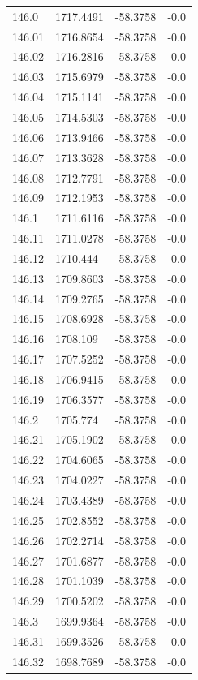 \begin{table}[H]
\begin{tabular}{llll}
146.0 & 1717.4491 & -58.3758 & -0.0 \\
146.01 & 1716.8654 & -58.3758 & -0.0 \\
146.02 & 1716.2816 & -58.3758 & -0.0 \\
146.03 & 1715.6979 & -58.3758 & -0.0 \\
146.04 & 1715.1141 & -58.3758 & -0.0 \\
146.05 & 1714.5303 & -58.3758 & -0.0 \\
146.06 & 1713.9466 & -58.3758 & -0.0 \\
146.07 & 1713.3628 & -58.3758 & -0.0 \\
146.08 & 1712.7791 & -58.3758 & -0.0 \\
146.09 & 1712.1953 & -58.3758 & -0.0 \\
146.1 & 1711.6116 & -58.3758 & -0.0 \\
146.11 & 1711.0278 & -58.3758 & -0.0 \\
146.12 & 1710.444 & -58.3758 & -0.0 \\
146.13 & 1709.8603 & -58.3758 & -0.0 \\
146.14 & 1709.2765 & -58.3758 & -0.0 \\
146.15 & 1708.6928 & -58.3758 & -0.0 \\
146.16 & 1708.109 & -58.3758 & -0.0 \\
146.17 & 1707.5252 & -58.3758 & -0.0 \\
146.18 & 1706.9415 & -58.3758 & -0.0 \\
146.19 & 1706.3577 & -58.3758 & -0.0 \\
146.2 & 1705.774 & -58.3758 & -0.0 \\
146.21 & 1705.1902 & -58.3758 & -0.0 \\
146.22 & 1704.6065 & -58.3758 & -0.0 \\
146.23 & 1704.0227 & -58.3758 & -0.0 \\
146.24 & 1703.4389 & -58.3758 & -0.0 \\
146.25 & 1702.8552 & -58.3758 & -0.0 \\
146.26 & 1702.2714 & -58.3758 & -0.0 \\
146.27 & 1701.6877 & -58.3758 & -0.0 \\
146.28 & 1701.1039 & -58.3758 & -0.0 \\
146.29 & 1700.5202 & -58.3758 & -0.0 \\
146.3 & 1699.9364 & -58.3758 & -0.0 \\
146.31 & 1699.3526 & -58.3758 & -0.0 \\
146.32 & 1698.7689 & -58.3758 & -0.0 \\

\end{tabular}
\end{table}
